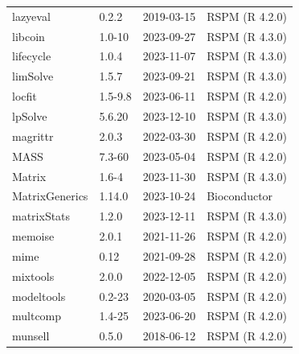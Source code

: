 \documentclass[graybox]{svmult}
\begin{document}
\begin{tabular}{llll}
lazyeval & 0.2.2 & 2019-03-15 & RSPM (R 4.2.0)\\
libcoin & 1.0-10 & 2023-09-27 & RSPM (R 4.3.0)\\
\addlinespace
lifecycle & 1.0.4 & 2023-11-07 & RSPM (R 4.3.0)\\
limSolve & 1.5.7 & 2023-09-21 & RSPM (R 4.3.0)\\
locfit & 1.5-9.8 & 2023-06-11 & RSPM (R 4.2.0)\\
lpSolve & 5.6.20 & 2023-12-10 & RSPM (R 4.3.0)\\
magrittr & 2.0.3 & 2022-03-30 & RSPM (R 4.2.0)\\
\addlinespace
MASS & 7.3-60 & 2023-05-04 & RSPM (R 4.2.0)\\
Matrix & 1.6-4 & 2023-11-30 & RSPM (R 4.3.0)\\
MatrixGenerics & 1.14.0 & 2023-10-24 & Bioconductor\\
matrixStats & 1.2.0 & 2023-12-11 & RSPM (R 4.3.0)\\
memoise & 2.0.1 & 2021-11-26 & RSPM (R 4.2.0)\\
\addlinespace
mime & 0.12 & 2021-09-28 & RSPM (R 4.2.0)\\
mixtools & 2.0.0 & 2022-12-05 & RSPM (R 4.2.0)\\
modeltools & 0.2-23 & 2020-03-05 & RSPM (R 4.2.0)\\
multcomp & 1.4-25 & 2023-06-20 & RSPM (R 4.2.0)\\
munsell & 0.5.0 & 2018-06-12 & RSPM (R 4.2.0)\\
\end{tabular}
\pagebreak
\end{document}
